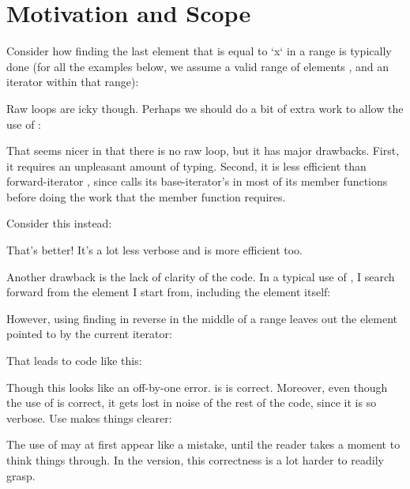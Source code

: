 \section{Motivation and Scope}

Consider how finding the last element that is equal to `x` in a range is
typically done (for all the examples below, we assume a valid range of
elements \code{[first, last)}, and an iterator  within that range):



Raw loops are icky though.  Perhaps we should do a bit of extra work to allow
the use of :



That seems nicer in that there is no raw loop, but it has major drawbacks.
First, it requires an unpleasant amount of typing.  Second, it is less
efficient than forward-iterator  , since 
calls its base-iterator's  in most of its member functions
before doing the work that the member function requires.

Consider this instead:



That's better!  It's a lot less verbose and is more efficient too.

Another drawback is the lack of clarity of the 
code.  In a typical use of , I search forward from the element I
start from, including the element itself:



However, using finding in reverse in the middle of a range leaves out the
element pointed to by the current iterator:



That leads to code like this:



Though this looks like an off-by-one error. is is correct.  Moreover, even
though the use of  is correct, it gets lost in noise of the rest
of the code, since it is so verbose.  Use  makes things
clearer:



The use of  may at first appear like a mistake, until the reader
takes a moment to think things through.  In the 
version, this correctness is a lot harder to readily grasp.
